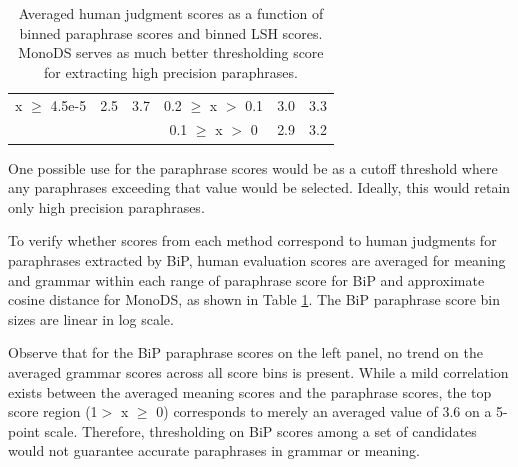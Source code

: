 \documentclass[11pt]{article}
\begin{document}
\begin{table}
\begin{center}
\begin{tabular}{ccc|ccc}
{\scriptsize x $\ge$ 4.5e-5} & {\scriptsize 2.5} & {\scriptsize 3.7} & {\scriptsize 0.2 $\geq$ x $>$ 0.1} & {\scriptsize 3.0} & {\scriptsize 3.3} \\
&&& {\scriptsize 0.1 $\geq$ x $>$ 0} & {\scriptsize 2.9} & {\scriptsize 3.2} \\
\hline
\end{tabular}
\end{center}
\caption{Averaged human judgment scores as a function of binned paraphrase scores and binned LSH scores. %
MonoDS serves as much better thresholding score for extracting high precision paraphrases.}
\label{table9}
\end{table}


One possible use for the paraphrase scores would be as a cutoff threshold where any paraphrases exceeding that value would be selected. Ideally, this would retain only high precision paraphrases.

To verify whether scores from each method correspond to human judgments for paraphrases extracted by BiP, human evaluation scores are averaged for meaning and grammar within each range of paraphrase score for BiP and approximate cosine distance for MonoDS, as shown in Table \ref{table9}. The BiP paraphrase score bin sizes are linear in log scale. 


Observe that for the BiP paraphrase scores on the left panel, no trend on the averaged grammar scores across all score bins is present. While a mild correlation exists between the averaged meaning scores and the paraphrase scores, the top score region (1$>$ x $\ge$ 0) corresponds to merely an averaged value of 3.6 on a 5-point scale. Therefore, thresholding on BiP scores among a set of candidates would not guarantee accurate paraphrases in grammar or meaning.
\end{document}
